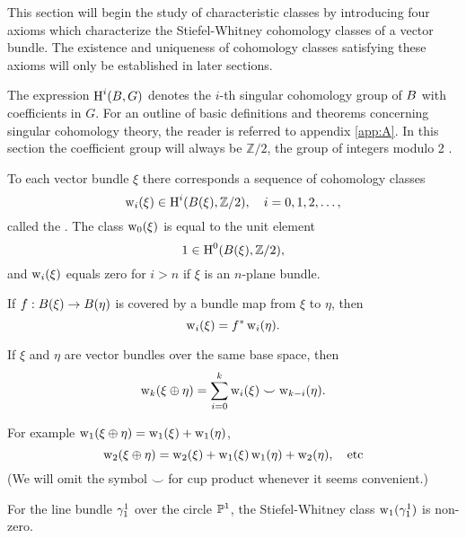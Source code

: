 \documentclass[../main]{subfiles}
\begin{document}
This section will begin the study of characteristic classes by introducing four axioms which characterize the Stiefel-Whitney cohomology classes of a vector bundle. The existence and uniqueness of cohomology classes satisfying these axioms will only be established in later sections.

The expression $\operatorname{H}^i(B,G)$ denotes the $i$-th singular cohomology group of $B$ with coefficients in $G$. For an outline of basic definitions and theorems concerning singular cohomology theory, the reader is referred to appendix \ref{app:A}. In this section the coefficient group will always be $\mathbb{Z} / 2$, the group of integers modulo 2 .

\begin{axiom}
\label{axi:04.01}
To each vector bundle $\xi$ there corresponds a sequence of cohomology classes
\[
\operatorname{w}_i(\xi) \in \operatorname{H}^i(B(\xi), \mathbb{Z} / 2), \quad i=0,1,2, \ldots,
\]
called the . The class $\operatorname{w}_0(\xi)$ is equal to the unit element
\[
1 \in \operatorname{H}^0(B(\xi), \mathbb{Z} / 2),
\]
and $\operatorname{w}_i(\xi)$ equals zero for $i > n$ if $\xi$ is an $n$-plane bundle.
\end{axiom}

\begin{axiom}[Naturality]
\label{axi:04.02}
If $f:B(\xi) \rightarrow B(\eta)$ is covered by a bundle map from $\xi$ to $\eta$, then
\[
\operatorname{w}_i(\xi) = f^*\operatorname{w}_i(\eta).
\]
\end{axiom}

\begin{axiom}
\label{axi:04.03}
If $\xi$ and $\eta$ are vector bundles over the same base space, then
\[
\operatorname{w}_k(\xi \oplus \eta)=\sum_{i=0}^{k} \operatorname{w}_i(\xi) \smile \operatorname{w}_{k-i}(\eta).
\]
\end{axiom}
For example $\operatorname{w}_1(\xi \oplus \eta)=\operatorname{w}_1(\xi)+\operatorname{w}_1(\eta)$, 
\[
\operatorname{w}_2(\xi \oplus \eta)=\operatorname{w}_2(\xi)+\operatorname{w}_1(\xi) \operatorname{w}_1(\eta)+\operatorname{w}_2(\eta), \quad \text{etc}
\]
(We will omit the symbol $\smile$ for cup product whenever it seems convenient.)

\begin{axiom}
\label{axi:04.04}
For the line bundle $\gamma_{1}^{1}$ over the circle $\mathbb{P}^{1}$, the Stiefel-Whitney class $\operatorname{w}_{1}(\gamma_{1}^{1})$ is non-zero.
\end{axiom}
\end{document}
